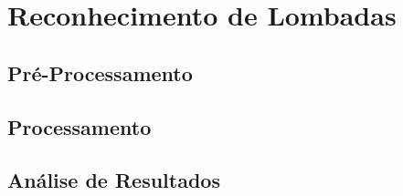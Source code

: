 \chapter{Reconhecimento de Lombadas}
\label{cap:deteccao_lombadas}

\section{Pré-Processamento}
\section{Processamento}
\section{Análise de Resultados}

